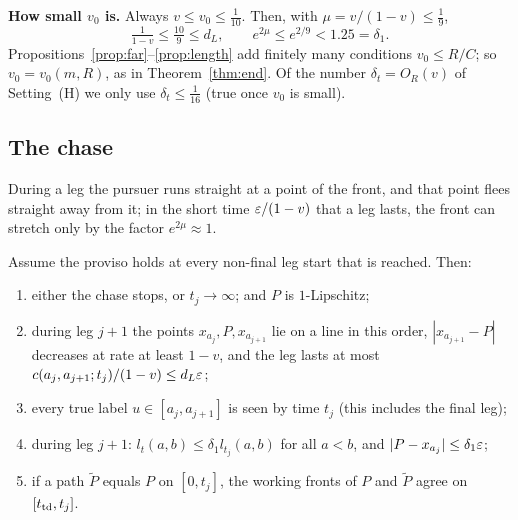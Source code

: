 \textbf{How small $v_0$ is.} Always $v\le v_0\le\frac1{10}$. Then, with $\mu=v/(1-v)\le\frac19$,
\begin{equation}\label{eq:V0}
\tfrac1{1-v}\le\tfrac{10}9\le d_L,\qquad e^{2\mu}\le e^{2/9}<1.25=\delta_1 .
\end{equation}
Propositions~\ref{prop:far}--\ref{prop:length} add finitely many conditions $v_0\le R/C$; so $v_0=v_0(m,R)$, as in
Theorem~\ref{thm:end}. Of the number $\delta_t=O_R(v)$ of Setting~(H) we only use $\delta_t\le\frac1{16}$ (true once
$v_0$ is small).

\subsection{The chase}\label{app:walk:chase}

During a leg the pursuer runs straight at a point of the front, and that point flees straight away from it; in the
short time $\varepsilon/(1-v)$ that a leg lasts, the front can stretch only by the factor $e^{2\mu}\approx1$.

\begin{lemma}\label{lem:chase}
Assume the proviso holds at every non-final leg start that is reached. Then:
\begin{enumerate}
\setlength{\itemsep}{1pt}\setlength{\parskip}{0pt}
\item[(0)] either the chase stops, or $t_j\to\infty$; and $P$ is $1$-Lipschitz;
\item[(1)] during leg $j+1$ the points $x_{a_j},P,x_{a_{j+1}}$ lie on a line in this order, $|x_{a_{j+1}}-P|$
decreases at rate at least $1-v$, and the leg lasts at most $c(a_j,a_{j+1};t_j)/(1-v)\le d_L\varepsilon$;
\item[(2)] every true label $u\in[a_j,a_{j+1}]$ is seen by time $t_j$ (this includes the final leg);
\item[(3)] during leg $j+1$: $l_t(a,b)\le\delta_1l_{t_j}(a,b)$ for all $a<b$, and $|P-x_{a_j}|\le\delta_1\varepsilon$;
\item[(4)] if a path $\tilde P$ equals $P$ on $[0,t_j]$, the working fronts of $P$ and $\tilde P$ agree on $[t_{\mathrm{td}},t_j]$.
\end{enumerate}
\end{lemma}


